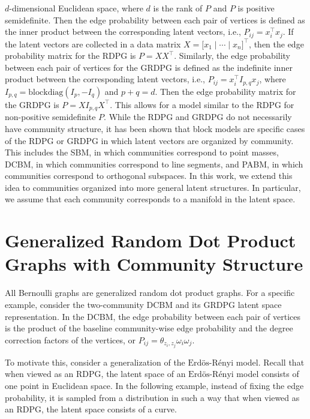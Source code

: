 \documentclass[12pt]{article}
\begin{document}
\(d\)-dimensional Euclidean space, where \(d\) is the rank of \(P\) and
\(P\) is positive semidefinite. Then the edge probability between each
pair of vertices is defined as the inner product between the
corresponding latent vectors, i.e., \(P_{ij} = x_i^\top x_j\). If the
latent vectors are collected in a data matrix
\(X = \bigl[ x_1 \mid \cdots \mid x_n \bigr]^\top\), then the edge
probability matrix for the RDPG is \(P = X X^\top\). Similarly, the edge
probability between each pair of vertices for the GRDPG is defined as
the indefinite inner product between the corresponding latent vectors,
i.e., \(P_{ij} = x_i^\top I_{p,q} x_j\), where
\(I_{p,q} = \mathrm{blockdiag}(I_p, -I_q)\) and \(p + q = d\). Then the
edge probability matrix for the GRDPG is \(P = X I_{p,q} X^\top\). This
allows for a model similar to the RDPG for non-positive semidefinite
\(P\). While the RDPG and GRDPG do not necessarily have community
structure, it has been shown that block models are specific cases of the
RDPG or GRDPG in which latent vectors are organized by community. This
includes the SBM, in which communities correspond to point masses, DCBM,
in which communities correspond to line segments, and PABM, in which
communities correspond to orthogonal subspaces. In this work, we extend
this idea to communities organized into more general latent structures.
In particular, we assume that each community corresponds to a manifold
in the latent space.

\hypertarget{generalized-random-dot-product-graphs-with-community-structure}{%
\section{Generalized Random Dot Product Graphs with Community
Structure}\label{generalized-random-dot-product-graphs-with-community-structure}}

All Bernoulli graphs are generalized random dot product graphs. For a
specific example, consider the two-community DCBM and its GRDPG latent
space representation. In the DCBM, the edge probability between each
pair of vertices is the product of the baseline community-wise edge
probability and the degree correction factors of the vertices, or
\(P_{ij} = \theta_{z_i, z_j} \omega_i \omega_j\).

To motivate this, consider a generalization of the
\(\text{Erd\"{o}s-R\'{e}nyi}\) model. Recall that when viewed as an
RDPG, the latent space of an \(\text{Erd\"{o}s-R\'{e}nyi}\) model
consists of one point in Euclidean space. In the following example,
instead of fixing the edge probability, it is sampled from a
distribution in such a way that when viewed as an RDPG, the latent space
consists of a curve.
\end{document}
